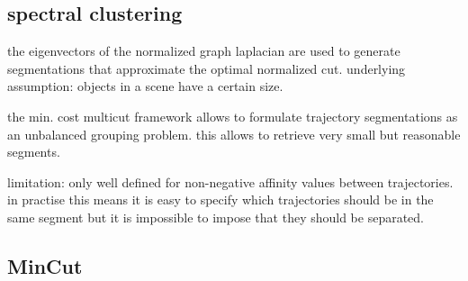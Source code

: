 \subsection{spectral clustering}
the eigenvectors of the normalized graph laplacian are used to generate segmentations that approximate the optimal normalized cut.
underlying assumption: objects in a scene have a certain size.

the min. cost multicut framework allows to formulate trajectory segmentations as an unbalanced grouping problem. this allows to retrieve very small but reasonable segments.

limitation: only well defined for non-negative affinity values between trajectories. in practise this means it is easy to specify which trajectories should be in the same segment but it is impossible to impose that they should be separated. 
\subsection{MinCut} 

